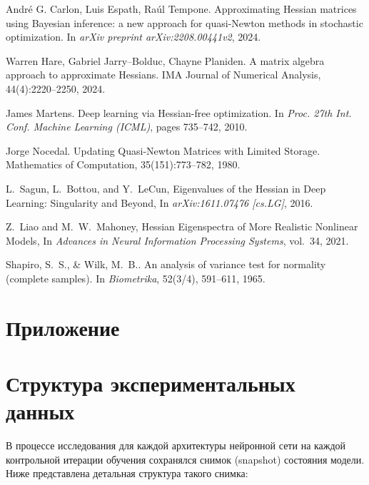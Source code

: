 \documentclass[a4paper,12pt]{article}
\begin{document}
\begin{thebibliography}{99}
  André G. Carlon, Luis Espath, Raúl Tempone.
  \newblock Approximating Hessian matrices using Bayesian inference: a new approach for quasi-Newton methods
  in stochastic optimization.
  \newblock In \emph{arXiv preprint arXiv:2208.00441v2}, 2024.

  Warren Hare, Gabriel Jarry–Bolduc, Chayne Planiden.
  \newblock A matrix algebra approach to approximate Hessians.
  \newblock IMA Journal of Numerical Analysis, 44(4):2220–2250, 2024.

  James Martens.
  \newblock Deep learning via Hessian-free optimization.
  \newblock In {\em Proc. 27th Int. Conf. Machine Learning (ICML)}, pages 735–742, 2010.

  Jorge Nocedal.
  \newblock Updating Quasi-Newton Matrices with Limited Storage.
  \newblock Mathematics of Computation, 35(151):773–782, 1980.

  L.~Sagun, L.~Bottou, and Y.~LeCun,
  \newblock Eigenvalues of the Hessian in Deep Learning: Singularity and Beyond,
  \newblock In \emph{arXiv:1611.07476 [cs.LG]}, 2016.

  Z.~Liao and M.~W.~Mahoney,
  \newblock Hessian Eigenspectra of More Realistic Nonlinear Models,
  \newblock In \emph{Advances in Neural Information Processing Systems}, vol.~34, 2021.

  Shapiro, S.~S., \& Wilk, M.~B..
  \newblock An analysis of variance test for normality (complete samples).
  \newblock In \emph{Biometrika}, 52(3/4), 591–611, 1965.

\end{thebibliography}

\section*{Приложение}

\section{Структура экспериментальных данных}

В процессе исследования для каждой архитектуры нейронной сети на каждой контрольной итерации обучения
сохранялся снимок (snapshot) состояния модели. Ниже представлена детальная структура такого снимка:
\end{document}
